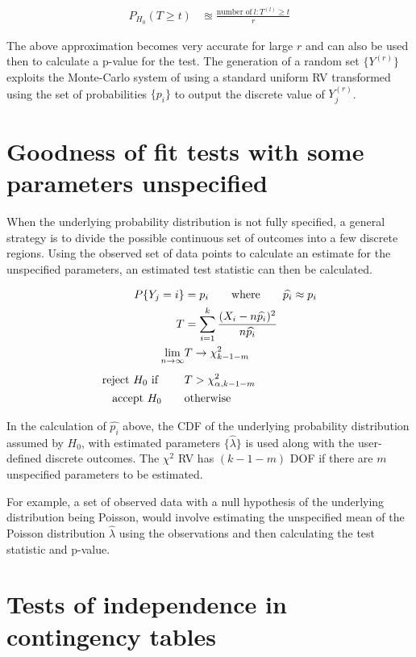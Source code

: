 \begin{align}
	P_{H_0} (T \geq t) &\approxeq \frac{\text{number of}\ l : T^{(l)} \geq t}{r}
\end{align}

The above approximation becomes very accurate for large $ r $ and can also be used then to calculate a p-value for the test. The generation of a random set $ \{Y^{(r)}\} $ exploits the Monte-Carlo system of using a standard uniform RV transformed using the set of probabilities $ \{p_i\} $ to output the discrete value of $ Y^{(r)}_j $.

\section{Goodness of fit tests with some parameters unspecified}

When the underlying probability distribution is not fully specified, a general strategy is to divide the possible continuous set of outcomes into a few discrete regions. Using the observed set of data points to calculate an estimate for the unspecified parameters, an estimated test statistic can then be calculated.

\begin{align}
	P\{Y_j = i\} &= p_i \qquad \text{where} \qquad \widehat{p_i} \approx p_i \\
	T &= \sum\limits_{i=1}^{k} \frac{(X_i - n\widehat{p_i})^2}{n\widehat{p_i}} \\
	\lim\limits_{n \to \infty} & T \to \chi^2_{k-1-m} \\[1ex]
	\text{reject $ H_0 $ if } \qquad & T > \chi^2_{\alpha, k-1-m}  \nonumber \\
	\text{accept $ H_0 $} \qquad & \text{otherwise}
\end{align}

In the calculation of $ \widehat{p_i} $ above, the CDF of the underlying probability distribution assumed by $ H_0 $, with estimated parameters $ \{\widehat{\lambda}\} $ is used along with the user-defined discrete outcomes. The $ \chi^2 $ RV has $ (k-1-m) $ DOF if there are $ m $ unspecified parameters to be estimated.

For example, a set of observed data with a null hypothesis of the underlying distribution being Poisson, would involve estimating the unspecified mean of the Poisson distribution $ \widehat{\lambda} $ using the observations and then calculating the test statistic and p-value.

\section{Tests of independence in contingency tables}

